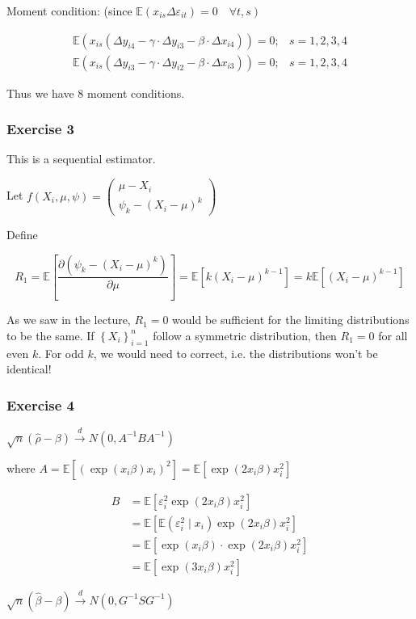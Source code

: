 {{Moment condition: (since $\left.\mathbb{E}\left( x_{is} \Delta \varepsilon_{i t}\right)=0 \quad \forall t, s\right)$

$$
\begin{array}{lll}
\mathbb{E}\left(x_{i s}\left(\Delta y_{i 4}-\gamma \cdot \Delta y_{i 3}-\beta \cdot \Delta x_{i 4}\right)\right)=0 ; & s=1,2,3,4 \\
\mathbb{E}\left(x_{i s}\left(\Delta y_{i 3}-\gamma \cdot \Delta y_{i 2}-\beta \cdot \Delta x_{i 3}\right)\right)=0 ; & s=1,2,3,4
\end{array}
$$

Thus we have 8 moment conditions.
}
{
\subsubsection*{Exercise 3}

This is a sequential estimator.

Let $f\left(X_{i}, \mu, \psi\right)=\left(\begin{array}{l}\mu-X_{i} \\ \psi_{k}-\left(X_{i}-\mu\right)^{k}\end{array}\right)$

Define 

$$
R_{1}=\mathbb{E}\left[\frac{\partial\left(\psi_{k}-\left(X_{i}-\mu\right)^{k}\right)}{\partial \mu}\right]=\mathbb{E}\left[k\left(X_{i}-\mu\right)^{k-1}\right]=k \mathbb{E}\left[\left(X_{i}-\mu\right)^{k-1}\right]
$$

As we saw in the lecture, $R_{1}=0$ would be sufficient for the limiting distributions to be the same. If $ \left\{X_{i}\right\}_{i=1}^{n}$ follow a symmetric distribution, then $R_{1}=0$ for all even $k$. For odd $k$, we would need to correct, i.e. the distributions won't be identical!
}
{
\subsubsection*{Exercise 4}

\begin{enumerate}[label=(\alph*)]
{\item 
$\sqrt{n}(\hat{\rho}-\beta) \xrightarrow{d} N\left(0, A^{-1} B A^{-1}\right)$

where $A=\mathbb{E}\left[\left(\exp \left(x_{i} \beta\right) x_{i}\right)^{2}\right]=\mathbb{E}\left[\exp \left(2 x_{i} \beta\right) x_{i}^{2}\right]$

$$
\begin{aligned}
B & =\mathbb{E}\left[\varepsilon_{i}^{2} \exp \left(2 x_{i} \beta\right) x_{i}^{2}\right] \\
& =\mathbb{E}\left[\mathbb{E}\left(\varepsilon_{i}^{2} \mid x_{i}\right) \exp \left(2 x_{i} \beta\right) x_{i}^{2}\right] \\
& =\mathbb{E}\left[\exp \left(x_{i} \beta\right) \cdot \exp \left(2 x_{i} \beta\right) x_{i}^{2}\right] \\
& =\mathbb{E}\left[\exp \left(3 x_{i} \beta\right) x_{i}^{2}\right]
\end{aligned}
$$
}
{\item 
$\sqrt{n}(\hat{\beta}-\beta) \xrightarrow{d} N\left(0, G^{-1} S G^{-1}\right)$

}
\end{enumerate}}}
